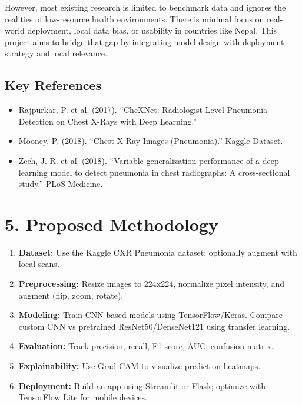 \documentclass[12pt]{article}
\begin{document}
However, most existing research is limited to benchmark data and ignores the realities of low-resource health environments. There is minimal focus on real-world deployment, local data bias, or usability in countries like Nepal. This project aims to bridge that gap by integrating model design with deployment strategy and local relevance.

\subsection*{Key References}
\begin{itemize}
  \item Rajpurkar, P. et al. (2017). “CheXNet: Radiologist-Level Pneumonia Detection on Chest X-Rays with Deep Learning.”
  \item Mooney, P. (2018). “Chest X-Ray Images (Pneumonia).” Kaggle Dataset.
  \item Zech, J. R. et al. (2018). “Variable generalization performance of a deep learning model to detect pneumonia in chest radiographs: A cross-sectional study.” PLoS Medicine.
\end{itemize}

\section*{5. Proposed Methodology}
\begin{enumerate}
  \item \textbf{Dataset:} Use the Kaggle CXR Pneumonia dataset; optionally augment with local scans.
  \item \textbf{Preprocessing:} Resize images to 224x224, normalize pixel intensity, and augment (flip, zoom, rotate).
  \item \textbf{Modeling:} Train CNN-based models using TensorFlow/Keras. Compare custom CNN vs pretrained ResNet50/DenseNet121 using transfer learning.
  \item \textbf{Evaluation:} Track precision, recall, F1-score, AUC, confusion matrix.
  \item \textbf{Explainability:} Use Grad-CAM to visualize prediction heatmaps.
  \item \textbf{Deployment:} Build an app using Streamlit or Flask; optimize with TensorFlow Lite for mobile devices.
\end{enumerate}
\end{document}

